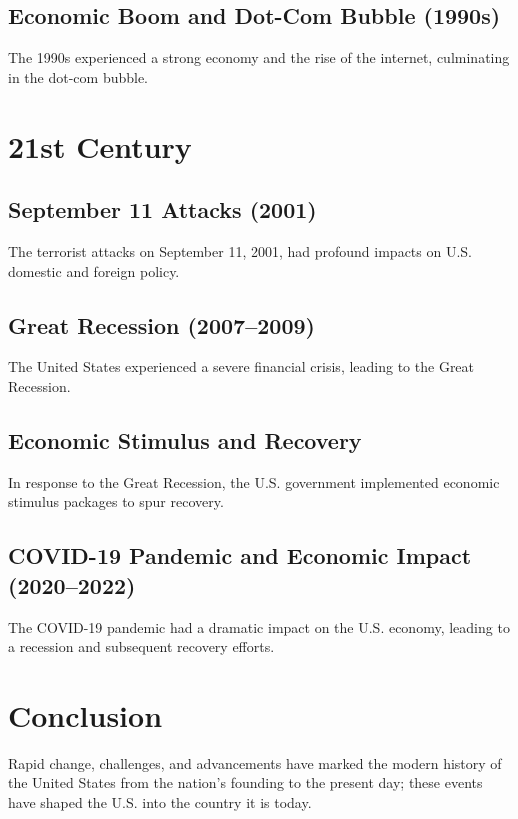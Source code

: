 \documentclass[a4paper,12pt]{book}
\begin{document}
\subsection{Economic Boom and Dot-Com Bubble (1990s)}
\label{subsec:economic-boom-dot-com-bubble}
The 1990s experienced a strong economy and the rise of the internet, culminating in the dot-com bubble.

\section{21st Century}
\label{sec:21st-century}
\subsection{September 11 Attacks (2001)}
\label{subsec:september-11-attacks}
The terrorist attacks on September 11, 2001, had profound impacts on U.S. domestic and foreign policy.

\subsection{Great Recession (2007–2009)}
\label{subsec:great-recession}
The United States experienced a severe financial crisis, leading to the Great Recession.

\subsection{Economic Stimulus and Recovery}
\label{subsec:economic-stimulus-recovery}
In response to the Great Recession, the U.S. government implemented economic stimulus packages to spur recovery.

\subsection{COVID-19 Pandemic and Economic Impact (2020–2022)}
\label{subsec:covid19-pandemic-economic-impact}
The COVID-19 pandemic had a dramatic impact on the U.S. economy, leading to a recession and subsequent recovery efforts.

\section{Conclusion}
\label{sec:conclusion-modern-usa}
Rapid change, challenges, and advancements have marked the modern history of the United States from the nation's founding to the present day; these events have shaped the U.S. into the country it is today.
\end{document}
